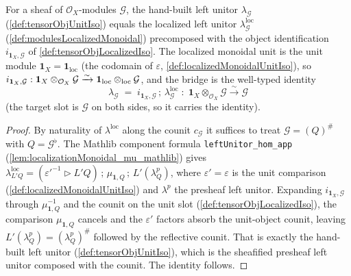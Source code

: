 \begin{lemma}
  \label{lem:tensorObjUnitor_eq_localized}
  For a sheaf of \(\mathcal{O}_X\)-modules \(\mathcal{G}\), the hand-built left
  unitor \(\lambda_{\mathcal{G}}\) (\cref{def:tensorObjUnitIso}) equals the
  localized left unitor \(\lambda^{\mathrm{loc}}_{\mathcal{G}}\)
  (\cref{def:modulesLocalizedMonoidal}) precomposed with the object identification
  \(i_{\mathbf{1}_X,\mathcal{G}}\) of \cref{def:tensorObjLocalizedIso}. The
  localized monoidal unit is the unit module
  \(\mathbf{1}_X = \mathbf{1}_{\mathrm{loc}}\) (the codomain of \(\varepsilon\),
  \cref{def:localizedMonoidalUnitIso}), so
  \(i_{\mathbf{1}_X,\mathcal{G}} : \mathbf{1}_X \otimes_{\mathcal{O}_X}
  \mathcal{G} \xrightarrow{\sim} \mathbf{1}_{\mathrm{loc}} \mathbin{\otimes_{\mathrm{loc}}} \mathcal{G}\),
  and the bridge is the well-typed identity
  \[
    \lambda_{\mathcal{G}}
      \;=\; i_{\mathbf{1}_X,\mathcal{G}} \,;\,
        \lambda^{\mathrm{loc}}_{\mathcal{G}}
    \;:\; \mathbf{1}_X \otimes_{\mathcal{O}_X} \mathcal{G}
      \xrightarrow{\sim} \mathcal{G}
  \]
  (the target slot is \(\mathcal{G}\) on both sides, so it carries the identity).
\end{lemma}

\begin{proof}
  By naturality of \(\lambda^{\mathrm{loc}}\) along the counit \(c_{\mathcal{G}}\)
  it suffices to treat \(\mathcal{G} = (Q)^{\#}\) with \(Q = \mathcal{G}^{\flat}\).
  The Mathlib component formula \texttt{leftUnitor\_hom\_app}
  (\cref{lem:localizationMonoidal_mu_mathlib}) gives
  \(\lambda^{\mathrm{loc}}_{L'Q} = (\varepsilon'^{-1} \rhd L'Q)\,;\,
  \mu_{\mathbf{1},Q}\,;\, L'(\lambda^p_Q)\), where \(\varepsilon' = \varepsilon\)
  is the unit comparison (\cref{def:localizedMonoidalUnitIso}) and \(\lambda^p\)
  the presheaf left unitor. Expanding \(i_{\mathbf{1}_X,\mathcal{G}}\) through
  \(\mu_{\mathbf{1},Q}^{-1}\) and the counit on the unit slot
  (\cref{def:tensorObjLocalizedIso}), the comparison \(\mu_{\mathbf{1},Q}\) cancels
  and the \(\varepsilon'\) factors absorb the unit-object counit, leaving
  \(L'(\lambda^p_Q) = (\lambda^p_Q)^{\#}\) followed by the reflective counit. That
  is exactly the hand-built left unitor (\cref{def:tensorObjUnitIso}), which is the
  sheafified presheaf left unitor composed with the counit. The identity follows.
\end{proof}

